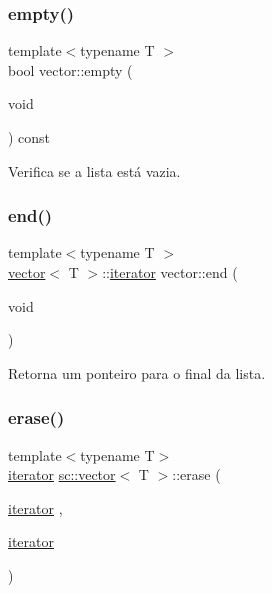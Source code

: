 \mbox{\label{classsc_1_1vector_ae189cd89e598a752b891e55869694f17}} 
\subsubsection{\texorpdfstring{empty()}{empty()}}
{\footnotesize\ttfamily template$<$typename T $>$ \\
bool vector\+::empty (\begin{DoxyParamCaption}\item[{void}]{ }\end{DoxyParamCaption}) const}



Verifica se a lista está vazia. 

\mbox{\label{classsc_1_1vector_a15b7f4313d7a011694d154c030768ad3}} 
\subsubsection{\texorpdfstring{end()}{end()}}
{\footnotesize\ttfamily template$<$typename T $>$ \\
\hyperlink{classsc_1_1vector}{vector}$<$ T $>$\+::\hyperlink{classsc_1_1vector_a9e5d5cc35e379aa27a93989f4a71413c}{iterator} vector\+::end (\begin{DoxyParamCaption}\item[{void}]{ }\end{DoxyParamCaption})}



Retorna um ponteiro para o final da lista. 

\mbox{\label{classsc_1_1vector_a916036c5dc2ec3dacea42f08706bce33}} 
\subsubsection{\texorpdfstring{erase()}{erase()}\hspace{0.1cm}{\footnotesize\ttfamily [1/2]}}
{\footnotesize\ttfamily template$<$typename T$>$ \\
\hyperlink{classsc_1_1vector_a9e5d5cc35e379aa27a93989f4a71413c}{iterator} \hyperlink{classsc_1_1vector}{sc\+::vector}$<$ T $>$\+::erase (\begin{DoxyParamCaption}\item[{\hyperlink{classsc_1_1vector_a9e5d5cc35e379aa27a93989f4a71413c}{iterator}}]{,  }\item[{\hyperlink{classsc_1_1vector_a9e5d5cc35e379aa27a93989f4a71413c}{iterator}}]{ }\end{DoxyParamCaption})}

